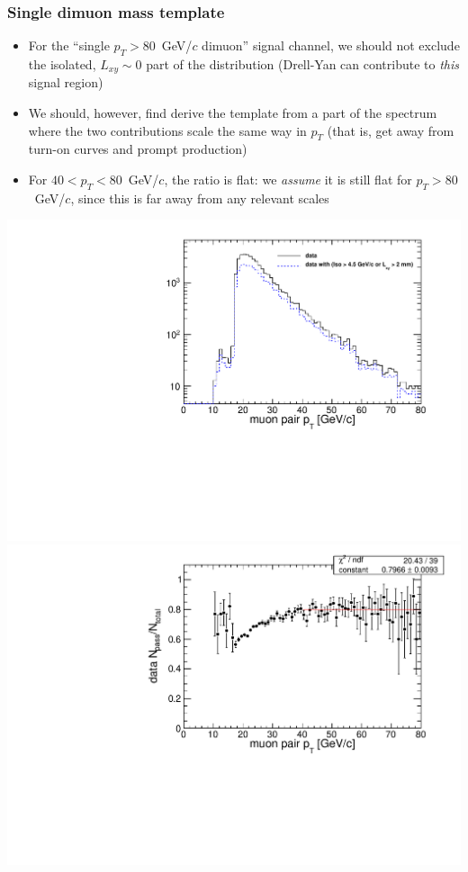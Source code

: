 \documentclass[compress]{beamer}
\begin{document}
\begin{frame}
\frametitle{Single dimuon mass template}

\begin{itemize}
\item For the ``single $p_T > 80$~GeV/$c$ dimuon'' signal channel, we
  should not exclude the isolated, $L_{xy} \sim 0$ part of the distribution
  (Drell-Yan can contribute to {\it this} signal region)
\item We should, however, find derive the template from a part of the
  spectrum where the two contributions scale the same way in $p_T$
  (that is, get away from turn-on curves and prompt production)
\item For $40 < p_T < 80$~GeV/$c$, the ratio is flat: we {\it assume} it is still flat for $p_T > 80$~GeV/$c$, since this is far away from any relevant scales
\end{itemize}

\begin{center}
\includegraphics[width=0.5\linewidth]{lowdimuon_40-80_distributions.pdf}
\includegraphics[width=0.5\linewidth]{lowdimuon_40-80_ratio.pdf}
\end{center}
\end{frame}
\end{document}

